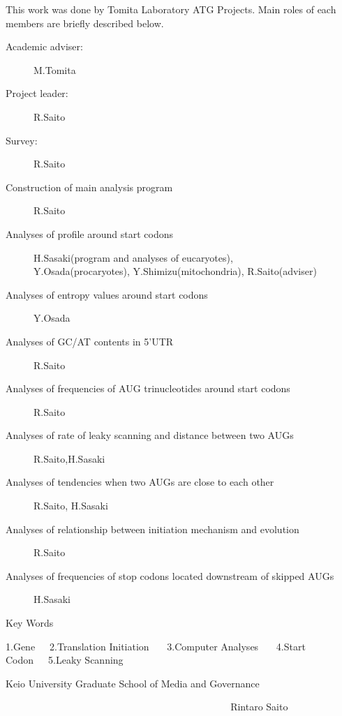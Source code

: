\begin{small}
This work was done by Tomita Laboratory ATG Projects.
Main roles of each members are briefly described below. 

\begin{description}
\item[Academic adviser:] M.Tomita
\item[Project leader:] R.Saito
\item[Survey:] R.Saito
\item[Construction of main analysis program] R.Saito
\item[Analyses of profile around start codons] 
H.Sasaki(program and analyses of
eucaryotes), \\Y.Osada(procaryotes), Y.Shimizu(mitochondria), R.Saito(adviser) 
\item[Analyses of entropy values around start codons] Y.Osada
\item[Analyses of GC/AT contents in 5'UTR] R.Saito
\item[Analyses of frequencies of AUG trinucleotides around start
codons] R.Saito
\item[Analyses of rate of leaky scanning and distance between two
AUGs] R.Saito,H.Sasaki
\item[Analyses of tendencies when two AUGs are close to each other]
R.Saito, H.Sasaki
\item[Analyses of relationship between initiation mechanism and
evolution]
R.Saito
\item[Analyses of frequencies of stop codons located downstream of
skipped AUGs] H.Sasaki

\end{description}
\end{small}

\vspace{2ex}
\noindent
Key Words
\begin{small}
\begin{center}
1.Gene\ \ \  2.Translation Initiation \ \ \ 3.Computer Analyses \ \ \ 4.Start Codon\ \ \ 5.Leaky Scanning

\end{center}
\end{small}
\vspace{2ex}

\begin{center}
{\large Keio University Graduate School of Media and Governance}
\end{center}

\begin{large}
\verb+                                             +Rintaro Saito
\end{large}

